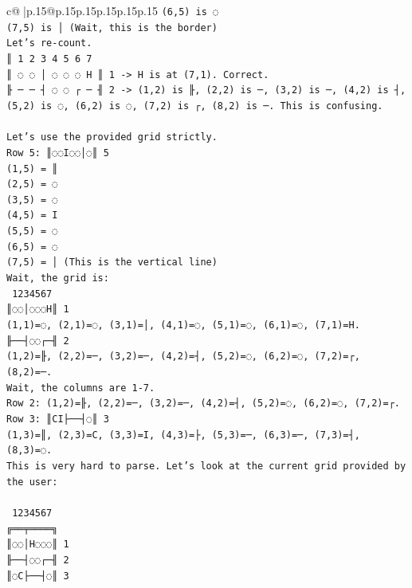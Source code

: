 \documentclass{article}
\begin{document}
{\begin{supertabular}{c@{$\;$}|p{.15\linewidth}@{}p{.15\linewidth}p{.15\linewidth}p{.15\linewidth}p{.15\linewidth}p{.15\linewidth}}
{{{\texttt{(6,5) is ◌} \\
\texttt{(7,5) is │ (Wait, this is the border)} \\
\texttt{Let's re{-}count.} \\
\texttt{║ 1 2 3 4 5 6 7} \\
\texttt{║ ◌ ◌ │ ◌ ◌ ◌ H ║ 1 {-}> H is at (7,1). Correct.} \\
\texttt{╟ ─ ─ ┤ ◌ ◌ ┌ ─ ╢ 2 {-}> (1,2) is ╟, (2,2) is ─, (3,2) is ─, (4,2) is ┤, (5,2) is ◌, (6,2) is ◌, (7,2) is ┌, (8,2) is ─. This is confusing.} \\
\\ 
\texttt{Let's use the provided grid strictly.} \\
\texttt{Row 5: ║◌◌I◌◌│◌║ 5} \\
\texttt{(1,5) = ║} \\
\texttt{(2,5) = ◌} \\
\texttt{(3,5) = ◌} \\
\texttt{(4,5) = I} \\
\texttt{(5,5) = ◌} \\
\texttt{(6,5) = ◌} \\
\texttt{(7,5) = │ (This is the vertical line)} \\
\texttt{Wait, the grid is:} \\
\texttt{ 1234567} \\
\texttt{║◌◌│◌◌◌H║ 1} \\
\texttt{(1,1)=◌, (2,1)=◌, (3,1)=│, (4,1)=◌, (5,1)=◌, (6,1)=◌, (7,1)=H.} \\
\texttt{╟──┤◌◌┌─╢ 2} \\
\texttt{(1,2)=╟, (2,2)=─, (3,2)=─, (4,2)=┤, (5,2)=◌, (6,2)=◌, (7,2)=┌, (8,2)=─.} \\
\texttt{Wait, the columns are 1{-}7.} \\
\texttt{Row 2: (1,2)=╟, (2,2)=─, (3,2)=─, (4,2)=┤, (5,2)=◌, (6,2)=◌, (7,2)=┌.} \\
\texttt{Row 3: ║CI├──┤◌║ 3} \\
\texttt{(1,3)=║, (2,3)=C, (3,3)=I, (4,3)=├, (5,3)=─, (6,3)=─, (7,3)=┤, (8,3)=◌.} \\
\texttt{This is very hard to parse. Let's look at the current grid provided by the user:} \\
\\ 
\texttt{ 1234567} \\
\texttt{╔══╤════╗} \\
\texttt{║◌◌│H◌◌◌║ 1} \\
\texttt{╟──┤◌◌┌─╢ 2} \\
\texttt{║◌C├──┤◌║ 3} \\
}}}
\end{supertabular}}
\end{document}
